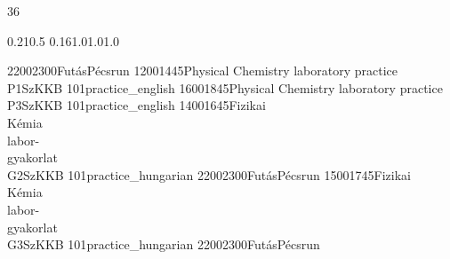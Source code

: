 \documentclass[a4paper,10pt]{report}
\begin{document}
\thispagestyle{empty}
\begin{landscape}
\noindent{}

\setslotsize{2.8cm}{0.3cm}
 {36}
\settextframe{0.8mm}



       {0.21}{0.5} {0.16}{1.0}{1.0}{1.0}

\begin{timetable}
   {2200}{2300}{Futás}{}{Pécs}{run}
   {1200}{1445}{Physical Chemistry laboratory practice \\ P1}{SzKK}{B 101}{practice_english}
   {1600}{1845}{Physical Chemistry laboratory practice \\ P3}{SzKK}{B 101}{practice_english}
   {1400}{1645}{Fizikai \\ Kémia \\ labor-\\gyakorlat \\ G2}{SzKK}{B 101}{practice_hungarian}
   {2200}{2300}{Futás}{}{Pécs}{run}
   {1500}{1745}{Fizikai \\ Kémia \\ labor-\\gyakorlat \\ G3}{SzKK}{B 101}{practice_hungarian}
   {2200}{2300}{Futás}{}{Pécs}{run}
\end{timetable}
\end{landscape}
\end{document}
